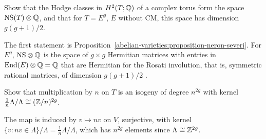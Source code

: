 \begin{exercise}\label{abelian-varieties:exercise-hodge-classes-torus}
Show that the Hodge classes in $H^2(T; \mathbb{Q})$ of a complex torus form the space $\mathrm{NS}(T) \otimes \mathbb{Q}$, and that for $T = E^g$, $E$ without CM, this space has dimension
$g(g + 1)/2$.
\end{exercise}

\begin{solution}
The first statement is Proposition~\ref{abelian-varieties:proposition-neron-severi}. For $E^g$, $\mathrm{NS} \otimes \mathbb{Q}$ is the space of $g \times g$ Hermitian matrices with entries in
$\operatorname{End}(E) \otimes \mathbb{Q} = \mathbb{Q}$ that are Hermitian for the Rosati involution, that is, symmetric rational matrices, of dimension $g(g + 1)/2$ \cite{birkenhake-lange}.
\end{solution}

\begin{exercise}\label{abelian-varieties:exercise-isogeny-dual}
Show that multiplication by $n$ on $T$ is an isogeny of degree $n^{2g}$ with kernel $\frac1n\Lambda/\Lambda \cong (\mathbb{Z}/n)^{2g}$.
\end{exercise}

\begin{solution}
The map is induced by $v \mapsto nv$ on $V$, surjective, with kernel $\{v : nv \in \Lambda\}/\Lambda = \frac1n\Lambda/\Lambda$, which has $n^{2g}$ elements since $\Lambda \cong \mathbb{Z}^{2g}$.
\end{solution}
